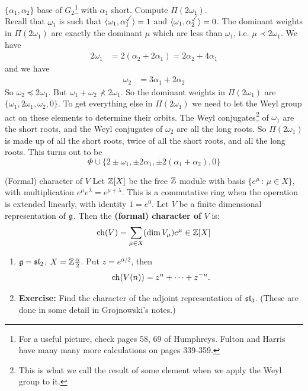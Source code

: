 \documentclass{article}
\begin{document}
\begin{ex*}
    $\{ \alpha_{1}, \alpha_{2}\}$ base of $G_{2}$\footnote{For a useful picture, check pages 58, 69 of Humphreys. Fulton and Harris have many many more calculations on pages 339-359.}  with $\alpha_{1}$ short. Compute $\Pi(2\omega_{1})$. \\ Recall that $\omega_{1}$ is such that $\langle \omega_{1}, \alpha_{1}^{\checked}\rangle = 1$ and $\langle \omega_{1}, \alpha_{2}^{\checked} \rangle = 0$. The dominant weights in $\Pi(2\omega_{1})$ are exactly the dominant $\mu$ which are less than $\omega_{1}$, i.e. $\mu \prec 2\omega_{1}$. We have \begin{align*}
        2 \omega_{1} &= 2(\alpha_{2} + 2\alpha_{1}) = 2\alpha_{2} + 4\alpha_{1}
    \end{align*}
    and we have \begin{align*}
        \omega_{2} &= 3\alpha_{1} + 2\alpha_{2}
    \end{align*}
    So $\omega_{2} \preceq 2 \omega_{1}$. But $\omega_{1} + \omega_{2} \nprec 2\omega_{1}$. \gap 
    So the dominant weights in $\Pi(2\omega_{1})$ are $\{\omega_{1}, 2\omega_{1}, \omega_{2}, 0 \}$. To get everything else in $\Pi(2\omega_{1})$ we need to let the Weyl group act on these elements to determine their orbits. The Weyl conjugates\footnote{This is what we call the result of some element when we apply the Weyl group to it.} of $\omega_{1}$ are the short roots, and the Weyl conjugates of $\omega_{2}$ are all the long roots. So $\Pi(2 \omega_{1})$ is made up of all the short roots, twice of all the short roots, and all the long roots. This turns out to be \[ \Phi \cup \{2\pm  \omega_{1}, \pm 2\alpha_{1}, \pm 2(\alpha_{1} + \alpha_{2}),0 \} \]
\end{ex*}
\begin{fancydefine}{(Formal) character of $V$}
    Let $\mathbb{Z}[X]$ be the free $\mathbb{Z}$ module with basis $\{ e^{\mu} \, : \, \mu \in X\}$, with multiplication $e^{\mu}e^{\lambda} = e^{\mu + \lambda}$. This is a commutative ring when the operation is extended linearly, with identity $1 = e^{0}$.\gap
    Let $V$ be a finite dimensional representation of $\mathfrak{g}$. Then the \textbf{(formal) character of} $V$ is: \[\operatorname{ch}(V) = \sum_{\mu \in X} (\dim V_{\mu})e^{\mu} \in \mathbb{Z}[X] \]
\end{fancydefine}
\begin{ex*}\hspace{0.1cm}
    \begin{enumerate}
    \item $\mathfrak{g} = \mathfrak{sl}_{2}$, $X = \mathbb{Z} \frac{\alpha}{2}$. Put $z =e^{\alpha/2}$, then \[ \operatorname{ch}(V(n)) = z^{n} + \dots + z^{-n}. \]
    \item \textbf{Exercise: } Find the character of the adjoint representation of $\mathfrak{sl}_{3}$. (These are done in some detail in Grojnowski's notes.)
\end{enumerate}
\end{ex*}
\end{document}
